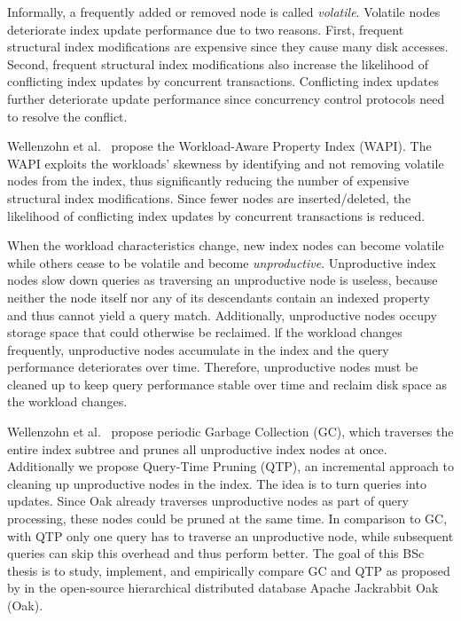 \documentclass[abstracton,12pt]{scrartcl}
\theoremstyle{definition}
\begin{document}
Informally, a frequently added or removed node is called \textit{volatile}.
Volatile nodes deteriorate index update performance due to two reasons. First,
frequent structural index modifications are expensive since they cause many disk
accesses. Second, frequent structural index modifications also increase the
likelihood of conflicting index updates by concurrent transactions. Conflicting
index updates further deteriorate update performance since concurrency control
protocols need to resolve the conflict.

Wellenzohn et al.~\cite{KW17} propose the Workload-Aware Property Index (WAPI).
The WAPI exploits the workloads' skewness by identifying and not removing
volatile nodes from the index, thus significantly reducing the number of
expensive structural index modifications. Since fewer nodes are
inserted/deleted, the likelihood of conflicting index updates by concurrent
transactions is reduced.

When the workload characteristics change, new index nodes can become volatile
while others cease to be volatile and become \textit{unproductive}. Unproductive
index nodes slow down queries as traversing an unproductive node is useless,
because neither the node itself nor any of its descendants contain an indexed
property and thus cannot yield a query match. Additionally, unproductive nodes
occupy storage space that could otherwise be reclaimed. lf the workload changes
frequently, unproductive nodes accumulate in the index and the query
performance deteriorates over time. Therefore, unproductive nodes must be
cleaned up to keep query performance stable over time and reclaim disk space as
the workload changes.

Wellenzohn et al.~\cite{KW17} propose periodic Garbage Collection (GC), which
traverses the entire index subtree and prunes all unproductive index nodes at
once. Additionally we propose Query-Time Pruning (QTP), an incremental approach
to cleaning up unproductive nodes in the index. The idea is to turn queries into
updates. Since Oak already traverses unproductive nodes as part of query
processing, these nodes could be pruned at the same time. In comparison to GC,
with QTP only one query has to traverse an unproductive node, while subsequent
queries can skip this overhead and thus perform better.
The goal of this BSc thesis is to study, implement, and empirically compare GC
and QTP as proposed by \cite{KW17} in the open-source hierarchical distributed
database Apache Jackrabbit Oak (Oak).

\end{document}
